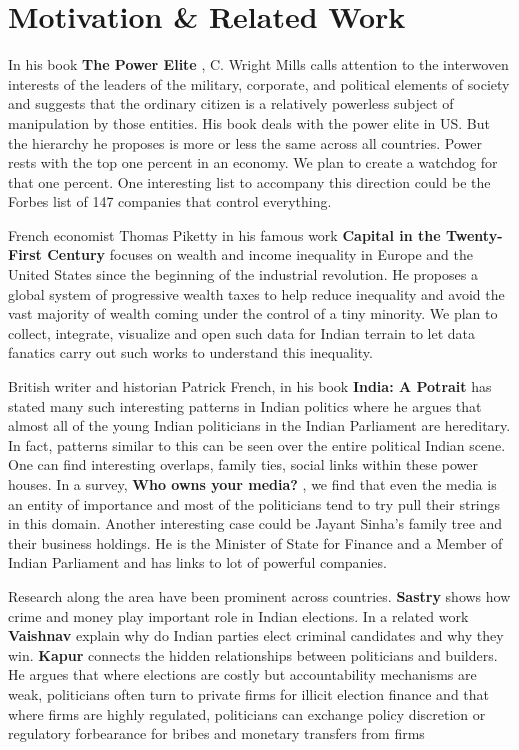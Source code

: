 \section{Motivation \& Related Work}

In his book \textbf{The Power Elite} \cite{Mills}, C. Wright Mills calls attention to the interwoven interests of the leaders of the military, corporate, and political elements of society and suggests that the ordinary citizen is a relatively powerless subject of manipulation by those entities. His book deals with the power elite in US. But the hierarchy he proposes is more or less the same across all countries. Power rests with the top one percent in an economy. We plan to create a watchdog for that one percent. One interesting list to accompany this direction could be the Forbes list \cite{FORBES} of 147 companies that control everything. 

French economist Thomas Piketty in his famous work \textbf{Capital in the Twenty-First Century} \cite{Piketty} focuses on wealth and income inequality in Europe and the United States since the beginning of the industrial revolution. He proposes a global system of progressive wealth taxes to help reduce inequality and avoid the vast majority of wealth coming under the control of a tiny minority. We plan to collect, integrate, visualize and open such data for Indian terrain to let data fanatics carry out such works to understand this inequality.

British writer and historian Patrick French, in his book \textbf{India: A Potrait} \cite{French} has stated many such interesting patterns in Indian politics where he argues that almost all of the young Indian politicians in the Indian Parliament are hereditary. In fact, patterns similar to this can be seen over the entire political Indian scene. One can find interesting overlaps, family ties, social links within these power houses. In a survey, \textbf{Who owns your media?} \cite{Media}, we find that even the media is an entity of importance and most of the politicians tend to try pull their strings in this domain. Another interesting case could be Jayant Sinha's family tree \cite{Sinha} and their business holdings. He is the Minister of State for Finance and a Member of Indian Parliament and has links to lot of powerful companies.

Research along the area have been prominent across countries. \textbf{Sastry} \cite{Sastry} shows how crime and money play important role in Indian elections. In a related work \textbf{Vaishnav} \cite{Essay} explain why do Indian parties elect criminal candidates and why they win. \textbf{Kapur} \cite{Builders} connects the hidden relationships between politicians and builders. He argues that where elections are costly but accountability mechanisms are weak, politicians often turn to private firms for illicit election finance and that where firms are highly regulated, politicians can exchange policy discretion or regulatory forbearance for bribes and monetary transfers from firms

